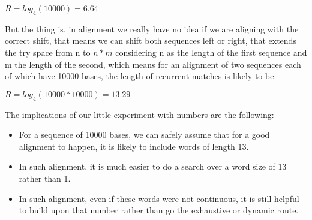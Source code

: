 \documentclass[12pt]{report}
\begin{document}
	\begin{center}
		$ R = log_{4}(10000) = 6.64 $
	\end{center}
	But the thing is, in alignment we really have no idea if we are aligning with the correct shift, that means we can shift both sequences left or right, that extends the try space from n to $ n*m $ considering n as the length of the first sequence and m the length of the second, which means for an alignment of two sequences each of which have 10000 bases, the length of recurrent matches is likely to be:
	\begin{center}
		$ R = log_{4}(10000*10000) = 13.29 $
	\end{center}
	The implications of our little experiment with numbers are the following:
	\begin{itemize}
		\item For a sequence of 10000 bases, we can safely assume that for a good alignment to happen, it is likely to include words of length 13.
		\item In such alignment, it is much easier to do a search over a word size of 13 rather than 1.
		\item In such alignment, even if these words were not continuous, it is still helpful to build upon that number rather than go the exhaustive or dynamic route.
	\end{itemize}
	\newpage
\end{document}
